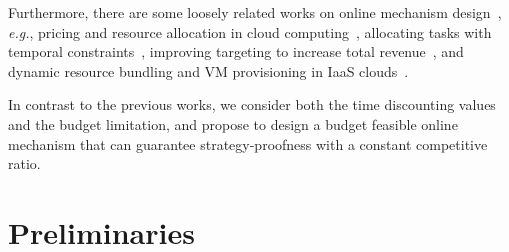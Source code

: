 \documentclass[conference,compsocconf,letterpaper,10pt]{IEEEtran}
\newcommand{\eg}{{\em e.g.}}
\newcommand{\et}{{\em et al. }}
\begin{document}
Furthermore, there are some loosely related works on online mechanism design~\cite{Naroditskiy:2013:ROM:2484920.2485023,Kesselheim:2015:SOM:2764468.2764487,Furuhata:2014:COC:2615731.2616027}, \eg,  pricing and resource allocation in cloud computing~\cite{Shi:2014:OAF:2591971.2591980}, allocating tasks with temporal constraints~\cite{nunes2015multi}, improving targeting to increase total revenue~\cite{Hummel:2015:ITI:2736277.2741079}, and dynamic resource bundling and VM provisioning in IaaS clouds~\cite{Zhang:2015:OAI:2796314.2745855}.

In contrast to the previous works, we consider both the time discounting values and the budget limitation, and propose to design a budget feasible online mechanism that can guarantee strategy-proofness with a constant competitive ratio.



\section{Preliminaries}
\end{document}
